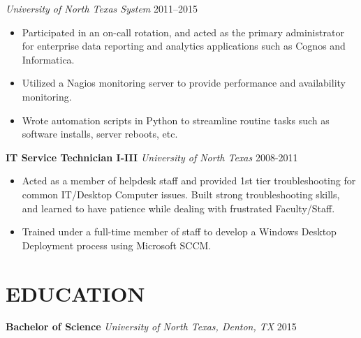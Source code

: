 \documentclass[margin,]{res}
\begin{document}
\begin{resume}
    \textit{University of North Texas System} \hfill 2011--2015 \\ [5pt]
    \begin{itemize}[leftmargin=10pt]
        \item Participated in an on-call rotation, and acted as the primary administrator for enterprise data reporting and analytics applications such as Cognos and Informatica.
        \item Utilized a Nagios monitoring server to provide performance and availability monitoring.
        \item Wrote automation scripts in Python to streamline routine tasks such as software installs, server reboots, etc.
    \end{itemize}
    \textbf{IT Service Technician I-III}
    \textit{University of North Texas} \hfill 2008-2011 \\ [5pt]
    \begin{itemize}[leftmargin=10pt]
        \item Acted as a member of helpdesk staff and provided 1st tier troubleshooting for common IT/Desktop Computer issues. Built strong troubleshooting skills, and learned to have patience while dealing with frustrated Faculty/Staff.
        \item Trained under a full-time member of staff to develop a Windows Desktop Deployment process using Microsoft SCCM.
    \end{itemize}
\section{EDUCATION} 
    \textbf{Bachelor of Science}
    \textit{University of North Texas, Denton, TX} \hfill 2015 \\ [5pt]
\end{resume}
\end{document}

